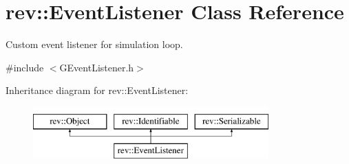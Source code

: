 \hypertarget{classrev_1_1_event_listener}{}\section{rev\+::Event\+Listener Class Reference}
\label{classrev_1_1_event_listener}


Custom event listener for simulation loop.  




{\ttfamily \#include $<$G\+Event\+Listener.\+h$>$}

Inheritance diagram for rev\+::Event\+Listener\+:\begin{figure}[H]
\begin{center}
\leavevmode
\includegraphics[height=2.000000cm]{classrev_1_1_event_listener}
\end{center}
\end{figure}
